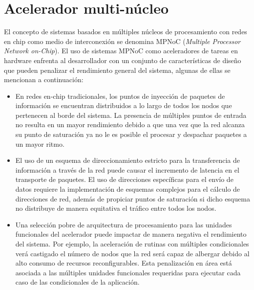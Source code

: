 \chapter{Acelerador multi-núcleo}
	\label{ch:acelerador_multinucleo}

El concepto de sistemas basados en múltiples núcleos de procesamiento con redes en chip como medio de interconexión se denomina MPNoC (\textit{Multiple Processor Network on-Chip}). El uso de sistemas MPNoC como aceleradores de tareas en hardware enfrenta al desarrollador con un conjunto de características de diseño que pueden penalizar el rendimiento general del sistema, algunas de ellas se mencionan a continuación:

\begin{itemize}

	\item En redes en-chip tradicionales, los puntos de inyección de paquetes de información se encuentran distribuidos a lo largo de todos los nodos que pertenecen al borde del sistema. La presencia de múltiples puntos de entrada no resulta en un mayor rendimiento debido a que una vez que la red alcanza su punto de saturación ya no le es posible el procesar y despachar paquetes a un mayor ritmo.

	\item El uso de un esquema de direccionamiento estricto para la transferencia de información a través de la red puede causar el incremento de latencia en el transporte de paquetes. El uso de direcciones específicas para el envío de datos requiere la implementación de esquemas complejos para el cálculo de direcciones de red, además de propiciar puntos de saturación si dicho esquema no distribuye de manera equitativa el tráfico entre todos los nodos.

	\item Una selección pobre de arquitectura de procesamiento para las unidades funcionales del acelerador puede impactar de manera negativa el rendimiento del sistema. Por ejemplo, la aceleración de rutinas con múltiples condicionales verá castigado el número de nodos que la red será capaz de albergar debido al alto consumo de recursos reconfigurables. Esta penalización en área está asociada a las múltiples unidades funcionales requeridas para ejecutar cada caso de las condicionales de la aplicación.

\end{itemize}


